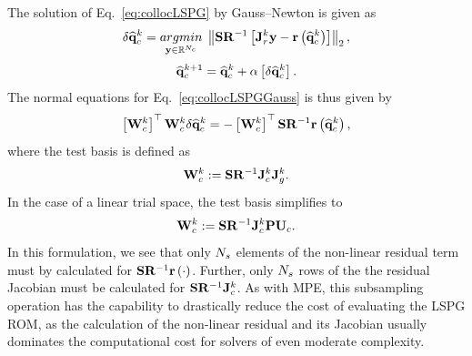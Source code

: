 The solution of Eq.~\ref{eq:collocLSPG} by Gauss--Newton is given as
%
\begin{equation}\label{eq:collocLSPGGauss}
    \delta \consVecCoef^{\newtonIdx} = \argmin{\dummyVec \inROne{\numConsModes}} \left\Vert \sampMat \resScaleInv \left[\jacobRes^{\newtonIdx} \dummyVec - \resFunc{\consVecCoef^{\newtonIdx}}\right] \right\Vert_2,
\end{equation}
\begin{equation}
    \mathbf{\widehat{q}}_{c}^{k + 1} = \mathbf{\widehat{q}}_{c}^{k} + \alpha \left[ \delta \mathbf{\widehat{q}}_{c}^{k} \right].
\end{equation}
%
The normal equations for Eq.~\ref{eq:collocLSPGGauss} is thus given by
%
\begin{equation}
    \left[\testBasisCons^{\newtonIdx}\right]^\top \testBasisCons^{\newtonIdx} \delta \consVecCoef^{\newtonIdx} = -\left[\testBasisCons^{\newtonIdx}\right]^\top \sampMat \resScaleInv \resFunc{\consVecCoef^{\newtonIdx}},
\end{equation}
%
where the test basis is defined as
%
\begin{equation}
    \testBasisCons^\newtonIdx \defEq \sampMat \resScaleInv \jacobCons^\newtonIdx \jacobDecode^{\newtonIdx}.
\end{equation}
%
In the case of a linear trial space, the test basis simplifies to
%
\begin{equation}
    \testBasisCons^\newtonIdx \defEq \sampMat \resScaleInv \jacobCons^\newtonIdx \consScale \consTrial.
\end{equation}
%
In this formulation, we see that only $N_s$ elements of the non-linear residual term must by calculated for $\sampMat \resScaleInv \resFunc{\cdot}$. Further, only $N_s$ rows of the the residual Jacobian must be calculated for $\sampMat \resScaleInv \jacobCons^\newtonIdx$. As with MPE, this subsampling operation has the capability to drastically reduce the cost of evaluating the LSPG ROM, as the calculation of the non-linear residual and its Jacobian usually dominates the computational cost for solvers of even moderate complexity.

